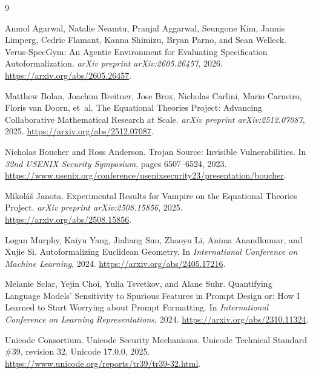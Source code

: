 \documentclass{article}
\begin{document}

\begin{thebibliography}{9}

Anmol Agarwal, Natalie Neamtu, Pranjal Aggarwal, Seungone Kim, Jannis Limperg,
Cedric Flamant, Kanna Shimizu, Bryan Parno, and Sean Welleck.
\newblock Verus-SpecGym: An Agentic Environment for Evaluating Specification
Autoformalization.
\newblock \emph{arXiv preprint arXiv:2605.26457}, 2026.
\newblock \url{https://arxiv.org/abs/2605.26457}.

Matthew Bolan, Joachim Breitner, Jose Brox, Nicholas Carlini, Mario Carneiro,
Floris van Doorn, et~al.
\newblock The Equational Theories Project: Advancing Collaborative Mathematical
Research at Scale.
\newblock \emph{arXiv preprint arXiv:2512.07087}, 2025.
\newblock \url{https://arxiv.org/abs/2512.07087}.

Nicholas Boucher and Ross Anderson.
\newblock Trojan Source: Invisible Vulnerabilities.
\newblock In \emph{32nd USENIX Security Symposium}, pages 6507--6524, 2023.
\newblock \url{https://www.usenix.org/conference/usenixsecurity23/presentation/boucher}.

Mikol\'{a}\v{s} Janota.
\newblock Experimental Results for Vampire on the Equational Theories Project.
\newblock \emph{arXiv preprint arXiv:2508.15856}, 2025.
\newblock \url{https://arxiv.org/abs/2508.15856}.

Logan Murphy, Kaiyu Yang, Jialiang Sun, Zhaoyu Li, Anima Anandkumar, and Xujie Si.
\newblock Autoformalizing Euclidean Geometry.
\newblock In \emph{International Conference on Machine Learning}, 2024.
\newblock \url{https://arxiv.org/abs/2405.17216}.

Melanie Sclar, Yejin Choi, Yulia Tsvetkov, and Alane Suhr.
\newblock Quantifying Language Models' Sensitivity to Spurious Features in
Prompt Design or: How I Learned to Start Worrying about Prompt Formatting.
\newblock In \emph{International Conference on Learning Representations}, 2024.
\newblock \url{https://arxiv.org/abs/2310.11324}.

Unicode Consortium.
\newblock Unicode Security Mechanisms.
\newblock Unicode Technical Standard \#39, revision 32, Unicode 17.0.0, 2025.
\newblock \url{https://www.unicode.org/reports/tr39/tr39-32.html}.


\end{thebibliography}
\end{document}
